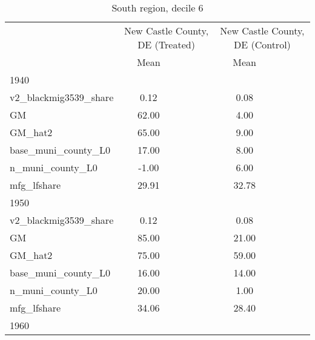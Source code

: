 \begin{table}[htbp]\centering
\def\sym#1{\ifmmode^{#1}\else\(^{#1}\)\fi}
\caption{South region, decile 6 \label{tab1}}
\begin{tabular}{l*{2}{ccc}}
\toprule
                    &\multicolumn{3}{c}{New Castle County, DE (Treated)}&\multicolumn{3}{c}{New Castle County, DE (Control)}\\
                    &        Mean&            &            &        Mean&            &            \\
\midrule
1940                &            &            &            &            &            &            \\
v2\_blackmig3539\_share&        0.12&            &            &        0.08&            &            \\
GM                  &       62.00&            &            &        4.00&            &            \\
GM\_hat2             &       65.00&            &            &        9.00&            &            \\
base\_muni\_county\_L0 &       17.00&            &            &        8.00&            &            \\
n\_muni\_county\_L0    &       -1.00&            &            &        6.00&            &            \\
mfg\_lfshare         &       29.91&            &            &       32.78&            &            \\
\midrule
1950                &            &            &            &            &            &            \\
v2\_blackmig3539\_share&        0.12&            &            &        0.08&            &            \\
GM                  &       85.00&            &            &       21.00&            &            \\
GM\_hat2             &       75.00&            &            &       59.00&            &            \\
base\_muni\_county\_L0 &       16.00&            &            &       14.00&            &            \\
n\_muni\_county\_L0    &       20.00&            &            &        1.00&            &            \\
mfg\_lfshare         &       34.06&            &            &       28.40&            &            \\
\midrule
1960                &            &            &            &            &            &            \\

\end{tabular}
\end{table}
